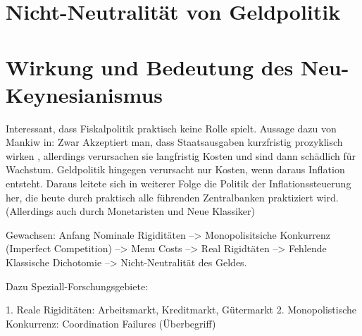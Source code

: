 \section{Nicht-Neutralität von Geldpolitik}


\textcite[S. 823]{Akerlof1985}





\section{Wirkung und Bedeutung des Neu-Keynesianismus}

Interessant, dass Fiskalpolitik praktisch keine Rolle spielt. Aussage dazu von Mankiw in: \parencite[S. 446]{Snowdon2005} Zwar Akzeptiert man, dass Staatsausgaben kurzfristig prozyklisch wirken \parencite[S. 408]{Snowdon2005}, allerdings verursachen sie langfristig Kosten und sind dann schädlich für Wachstum. Geldpolitik hingegen verursacht nur Kosten, wenn daraus Inflation entsteht. Daraus leitete sich in weiterer Folge \parencite[S. 413]{Snowdon2005} die Politik der Inflationssteuerung her, die heute durch praktisch alle führenden Zentralbanken praktiziert wird. (Allerdings auch durch Monetaristen und Neue Klassiker)

Gewachsen: Anfang Nominale Rigiditäten --> Monopolisitsiche Konkurrenz (Imperfect Competition) --> Menu Costs --> Real Rigidtäten --> Fehlende Klassische Dichotomie --> Nicht-Neutralität des Geldes.

Dazu Speziall-Forschungsgebiete: 

1. Reale Rigiditäten: Arbeitsmarkt, Kreditmarkt, Gütermarkt
2. Monopolistische Konkurrenz: Coordination Failures (Überbegriff)
